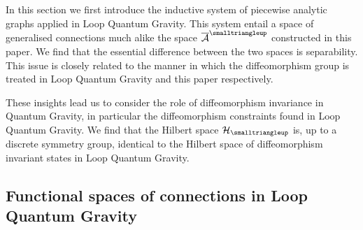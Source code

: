\documentclass[12pt]{article}
\def\ca{{\cal A}}
\def\cb{{\cal B}}
\def\ch{{\cal H}}
\begin{document}

In this section we first introduce the inductive system of piecewise analytic graphs applied in Loop Quantum Gravity. This system entail a space of generalised connections much alike the space $\overline{\ca}^{\smalltriangleup}$ constructed in this paper. We find that the essential difference between the two spaces is separability. This issue is closely related to the manner in which the diffeomorphism group is treated in Loop Quantum Gravity and this paper respectively.

These insights lead us to consider the role of diffeomorphism invariance in Quantum Gravity, in particular the diffeomorphism constraints found in Loop Quantum Gravity. We find that the Hilbert space $\ch_\smalltriangleup$ is, up to a discrete symmetry group, identical to the Hilbert space of diffeomorphism invariant states in Loop Quantum Gravity.




\subsection{Functional spaces of connections in Loop Quantum Gravity}




\end{document}
